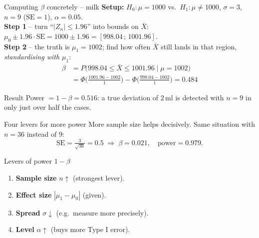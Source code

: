 \documentclass[aspectratio=169,11pt]{beamer}
\begin{document}
\begin{frame}{Computing $\beta$ concretely -- milk}
  \textbf{Setup:} $H_0:\mu=1000$ vs.\ $H_1:\mu\neq1000$, $\sigma=3$, $n=9$
  ($\mathrm{SE}=1$), $\alpha=0.05$.\\[2pt]
  \textbf{Step 1} -- turn ``$|Z_n|\le1.96$'' into bounds on $\bar X$:
  $\mu_0\pm1.96\cdot\mathrm{SE}=1000\pm1.96=[998.04\,;\,1001.96]$.\\[2pt]
  \textbf{Step 2} -- the truth is $\mu_1=1002$; find how often $\bar X$ still
  lands in that region, \emph{standardising with $\mu_1$}:
  \begin{align*}
    \beta &= P\bigl(998.04 \le \bar X \le 1001.96 \;\big|\; \mu=1002\bigr)\\
          &= \Phi\!\bigl(\tfrac{1001.96-1002}{1}\bigr) - \Phi\!\bigl(\tfrac{998.04-1002}{1}\bigr)
           = 0.484
  \end{align*}
  \begin{exampleblock}{Result}
    Power $=1-\beta = 0.516$: a true deviation of $2\,$ml is detected with
    $n=9$ in only just over half the cases.
  \end{exampleblock}
\end{frame}

\begin{frame}{Four levers for more power}
  More sample size helps decisively. Same situation with $n=36$ instead of $9$:
  \[
    \text{SE}=\tfrac{3}{\sqrt{36}}=0.5 \;\Rightarrow\; \beta = 0.021,\quad
    \text{power}=0.979.
  \]
  \begin{block}{Levers of power $1-\beta$}
    \begin{enumerate}
      \item \textbf{Sample size} $n\uparrow$ (strongest lever).
      \item \textbf{Effect size} $|\mu_1-\mu_0|$ (given).
      \item \textbf{Spread} $\sigma\downarrow$ (e.g.\ measure more precisely).
      \item \textbf{Level} $\alpha\uparrow$ (buys more Type I error).
    \end{enumerate}
  \end{block}
\end{frame}
\end{document}
